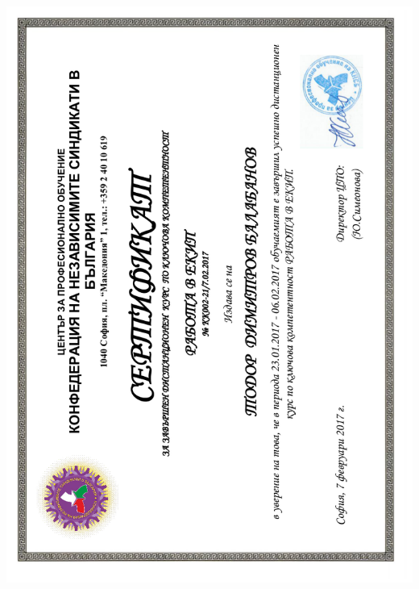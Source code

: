 \documentclass[bulgarian,a4paper]{europasscv}
\begin{document}
\includegraphics[width=\textwidth,height=\textheight,keepaspectratio]{KNSB2017_1}
\end{document}
